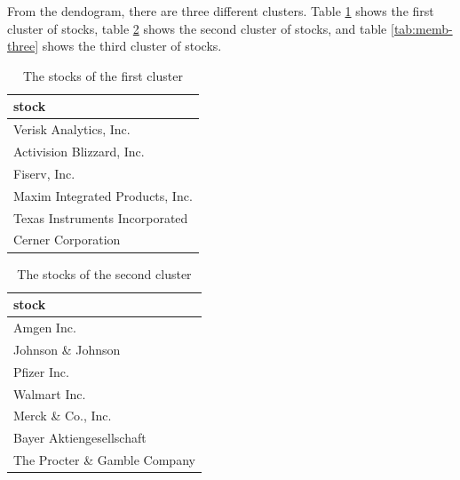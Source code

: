 \documentclass[11pt,a4paper,]{article}
\begin{document}
From the dendogram, there are three different clusters. Table \ref{tab:memb-w} shows the first cluster of stocks, table \ref{tab:memb-two} shows the second cluster of stocks, and table \ref{tab:memb-three} shows the third cluster of stocks.

\begin{table}

\caption{\label{tab:memb-w}The stocks of the first cluster}
\centering
\begin{tabular}[t]{l}
\hline
stock\\
\hline
Verisk Analytics, Inc.\\
\hline
Activision Blizzard, Inc.\\
\hline
Fiserv, Inc.\\
\hline
Maxim Integrated Products, Inc.\\
\hline
Texas Instruments Incorporated\\
\hline
Cerner Corporation\\
\hline
\end{tabular}
\end{table}

\begin{table}

\caption{\label{tab:memb-two}The stocks of the second cluster}
\centering
\begin{tabular}[t]{l}
\hline
stock\\
\hline
Amgen Inc.\\
\hline
Johnson \& Johnson\\
\hline
Pfizer Inc.\\
\hline
Walmart Inc.\\
\hline
Merck \& Co., Inc.\\
\hline
Bayer Aktiengesellschaft\\
\hline
The Procter \& Gamble Company\\
\hline
\end{tabular}
\end{table}
\end{document}
